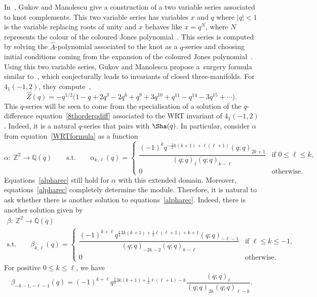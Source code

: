 \documentclass[pdftex]{sigma}
\numberwithin{equation}{section}
\def\BZ{\mathbb{Z}}
\def\BQ{\mathbb{Q}}
\def\be{\begin{equation}}
\def\ee{\end{equation}}
\def\WRT{\Sha}
\def\BZ{\mathbb Z}
\def\BQ{\mathbb Q}
\def\be{\begin{equation}}
\def\ee{\end{equation}}
\begin{document}
In~\cite{GukovMan}, Gukov and Manolescu give a construction of a two variable series associated to knot complements. This two variable series has variables $x$ and $q$ where $|q|<1$ is the variable replacing roots of unity and $x$ behaves like $x=q^{N}$, where $N$ represents the colour of the coloured Jones polynomial~\cite{Jones,RT:rib}. This series is computed by solving the $\hat{A}$-polynomial associated to the knot as a $q$-series and choosing initial conditions coming from the expansion of the coloured Jones polynomial~\cite{BarNatanGar,MelvinMorton,Rozansky}. Using this two variable series, Gukov and Manolescu propose a~surgery formula similar to~\cite{BelBlaLe}, which conjecturally leads to invariants of closed three-manifolds. For~$4_1(-1,2)$, they compute~\cite[Table 10]{GukovMan},
\be\label{zhatGM}
 \widehat{Z}(q)
  =
 -q^{1/2}\bigl(1 - q + 2q^3 - 2q^6 + q^9 + 3q^{10} + q^{11} - q^{14} - 3q^{15}+\cdots\bigr) .
\ee
This $q$-series will be seen to come from the specialisation of a solution of the $q$-difference equation~\eqref{8thorderqdiff} associated to the WRT invariant of $4_1(-1,2)$. Indeed, it is a natural $q$-series that pairs with $\WRT(q)$. In particular, consider $\alpha$ from equation~\eqref{WRTformula} as a function
\[
 \alpha\colon\ \BZ^2\rightarrow\BQ(q)
 \qquad \text{s.t.}\qquad
 \alpha_{k,\ell}(q)
  =\begin{cases}
 \dfrac{(-1)^{k}q^{-\frac{1}{2}k(k+1)+\ell(\ell+1)}(q;q)_{2k+1}}{(q;q)_{\ell}(q;q)_{k-\ell}} & \text{if }0\leq\ell\leq k,\\
 0 & \text{otherwise}.
 \end{cases}
\]
Equations~\eqref{alpharec} still hold for $\alpha$ with this extended domain. Moreover, equations~\eqref{alpharec} completely determine the module. Therefore, it is natural to ask whether there is another solution to equations~\eqref{alpharec}. Indeed, there is another solution given by
\begin{gather*}
 \beta\colon \ \BZ^2\rightarrow\BQ(q)\\
\text{s.t.}\qquad
 \beta_{k,\ell}(q)
  =\begin{cases}
 \dfrac{(-1)^{k+\ell}q^{\frac{1}{2}3k(k+1)+\frac{1}{2}\ell(\ell+1)+k+1}(q;q)_{-\ell-1}}{(q;q)_{-2k-2}(q;q)_{k-\ell}} & \text{if }\ell\leq k\leq-1,\\
 0 & \text{otherwise}.
 \end{cases}
\end{gather*}
For positive $0\leq k\leq\ell$, we have
\[
 \beta_{-k-1,-\ell-1}(q)
  =
 (-1)^{k+\ell}q^{\frac{1}{2}3k(k+1)+\frac{1}{2}\ell(\ell+1)-k}\frac{(q;q)_{\ell}}{(q;q)_{2k}(q;q)_{\ell-k}} .
\]
\end{document}
